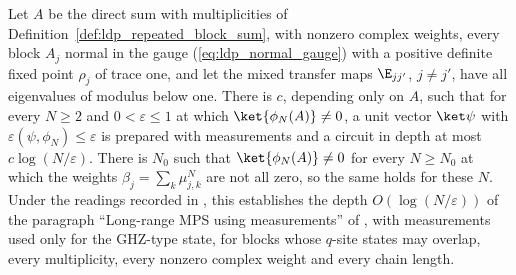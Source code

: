 \begin{lemma}
    \label{thm:ldp_overlapping_measurement_depth}
    \leanok
    Let $A$ be the direct sum with multiplicities of
    Definition~\ref{def:ldp_repeated_block_sum}, with nonzero complex weights,
    every block $A_j$ normal in the gauge (\ref{eq:ldp_normal_gauge}) with a
    positive definite fixed point $\rho_j$ of trace one, and let the mixed
    transfer maps $\E_{jj'}$, $j\neq j'$, have all eigenvalues of modulus below
    one. There is $c$, depending only on $A$, such that for every $N\geq2$ and
    $0<\varepsilon\leq1$ at which $\ket{\phi_N(A)}\neq0$, a unit vector
    $\ket\psi$ with $\varepsilon(\psi,\phi_N)\leq\varepsilon$ is prepared with
    measurements and a circuit in depth at most $c\log(N/\varepsilon)$. There is
    $N_0$ such that $\ket{\phi_N(A)}\neq0$ for every $N\geq N_0$ at which the
    weights $\beta_j=\sum_k\mu_{j,k}^N$ are not all zero, so the same holds for
    these $N$. Under the readings recorded in
    \cite{gap:mswc24_measurement_preparation_scope,gap:mswc24_block_form_mixed_overlap,gap:mswc24_depth_upper_bound_nonzero_state},
    this establishes the depth $O(\log(N/\varepsilon))$ of the paragraph
    ``Long-range MPS using measurements'' of \cite{Malz2024Preparation}, with
    measurements used only for the GHZ-type state, for blocks whose $q$-site
    states may overlap, every multiplicity, every nonzero complex weight and
    every chain length.
\end{lemma}
